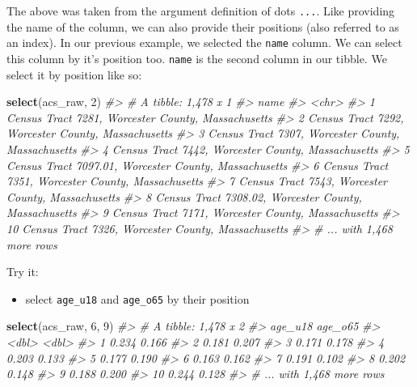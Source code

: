 \documentclass[
]{book}
\newenvironment{Shaded}{\begin{snugshade}}{\end{snugshade}}
\newcommand{\CommentTok}[1]{\textcolor[rgb]{0.56,0.35,0.01}{\textit{#1}}}
\newcommand{\DecValTok}[1]{\textcolor[rgb]{0.00,0.00,0.81}{#1}}
\newcommand{\KeywordTok}[1]{\textcolor[rgb]{0.13,0.29,0.53}{\textbf{#1}}}
\newcommand{\NormalTok}[1]{#1}
\providecommand{\tightlist}{%
  \setlength{\itemsep}{0pt}\setlength{\parskip}{0pt}}
\begin{document}
The above was taken from the argument definition of dots \texttt{...}. Like providing the name of the column, we can also provide their positions (also referred to as an index). In our previous example, we selected the \texttt{name} column. We can select this column by it's position too. \texttt{name} is the second column in our tibble. We select it by position like so:

\begin{Shaded}
\begin{Highlighting}[]
\KeywordTok{select}\NormalTok{(acs\_raw, }\DecValTok{2}\NormalTok{)}
\CommentTok{\#\textgreater{} \# A tibble: 1,478 x 1}
\CommentTok{\#\textgreater{}    name                                                 }
\CommentTok{\#\textgreater{}    \textless{}chr\textgreater{}                                                }
\CommentTok{\#\textgreater{}  1 Census Tract 7281, Worcester County, Massachusetts   }
\CommentTok{\#\textgreater{}  2 Census Tract 7292, Worcester County, Massachusetts   }
\CommentTok{\#\textgreater{}  3 Census Tract 7307, Worcester County, Massachusetts   }
\CommentTok{\#\textgreater{}  4 Census Tract 7442, Worcester County, Massachusetts   }
\CommentTok{\#\textgreater{}  5 Census Tract 7097.01, Worcester County, Massachusetts}
\CommentTok{\#\textgreater{}  6 Census Tract 7351, Worcester County, Massachusetts   }
\CommentTok{\#\textgreater{}  7 Census Tract 7543, Worcester County, Massachusetts   }
\CommentTok{\#\textgreater{}  8 Census Tract 7308.02, Worcester County, Massachusetts}
\CommentTok{\#\textgreater{}  9 Census Tract 7171, Worcester County, Massachusetts   }
\CommentTok{\#\textgreater{} 10 Census Tract 7326, Worcester County, Massachusetts   }
\CommentTok{\#\textgreater{} \# ... with 1,468 more rows}
\end{Highlighting}
\end{Shaded}

Try it:

\begin{itemize}
\tightlist
\item
  select \texttt{age\_u18} and \texttt{age\_o65} by their position
\end{itemize}

\begin{Shaded}
\begin{Highlighting}[]
\KeywordTok{select}\NormalTok{(acs\_raw, }\DecValTok{6}\NormalTok{, }\DecValTok{9}\NormalTok{)}
\CommentTok{\#\textgreater{} \# A tibble: 1,478 x 2}
\CommentTok{\#\textgreater{}    age\_u18 age\_o65}
\CommentTok{\#\textgreater{}      \textless{}dbl\textgreater{}   \textless{}dbl\textgreater{}}
\CommentTok{\#\textgreater{}  1   0.234   0.166}
\CommentTok{\#\textgreater{}  2   0.181   0.207}
\CommentTok{\#\textgreater{}  3   0.171   0.178}
\CommentTok{\#\textgreater{}  4   0.203   0.133}
\CommentTok{\#\textgreater{}  5   0.177   0.190}
\CommentTok{\#\textgreater{}  6   0.163   0.162}
\CommentTok{\#\textgreater{}  7   0.191   0.102}
\CommentTok{\#\textgreater{}  8   0.202   0.148}
\CommentTok{\#\textgreater{}  9   0.188   0.200}
\CommentTok{\#\textgreater{} 10   0.244   0.128}
\CommentTok{\#\textgreater{} \# ... with 1,468 more rows}
\end{Highlighting}
\end{Shaded}
\end{document}
